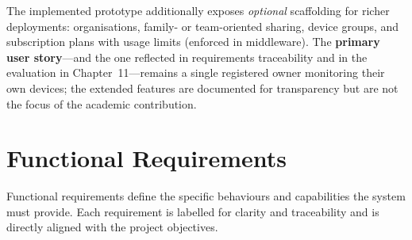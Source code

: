 The implemented prototype additionally exposes \emph{optional} scaffolding for richer deployments: organisations, family- or team-oriented sharing, device groups, and subscription plans with usage limits (enforced in middleware). The \textbf{primary user story}---and the one reflected in requirements traceability and in the evaluation in Chapter~11---remains a single registered owner monitoring their own devices; the extended features are documented for transparency but are not the focus of the academic contribution.

\section{Functional Requirements}

Functional requirements define the specific behaviours and capabilities the system must provide. Each requirement is labelled for clarity and traceability and is directly aligned with the project objectives.

